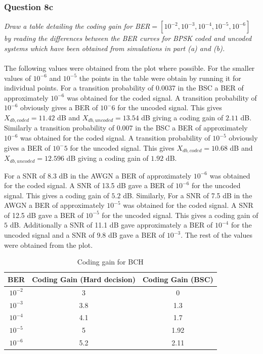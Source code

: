 \documentclass[a4paper]{article}
\begin{document}
\subsubsection{Question 8c} \textit{Draw a table detailing the coding gain for BER$= [10^{-2}, 10^{-3}, 10^{-4} , 10^{-5} , 10^{-6} ]$ by reading the differences between the BER curves for BPSK coded and uncoded systems which have been obtained from simulations in part (a) and (b).} \\
\\
The following values were obtained from the plot where possible. For the smaller values of $10^{-6}$ and $10^{-5}$ the points in the table were obtain by running it for individual points. For a transition probability of 0.0037 in the BSC a BER of approximately $10^{-6}$ was obtained for the coded signal. A transition probability of $10^{-6}$ obviously gives a BER of $10^-6$ for the uncoded signal. This gives $X_{db,coded} = 11.42 $ dB and $X_{db,uncoded} = 13.54 $ dB giving a coding gain of $2.11$ dB. Similarly a transition probability of 0.007 in the BSC a BER of approximately $10^{-6}$ was obtained for the coded signal. A transition probability of $10^{-5}$ obviously gives a BER of $10^-5$ for the uncoded signal. This gives $X_{db,coded} =  10.68$ dB and $X_{db,uncoded} = 12.596 $ dB giving a coding gain of $1.92$ dB. 

For a SNR of 8.3 dB in the AWGN a BER of approximately $10^{-6}$ was obtained for the coded signal. A SNR of 13.5 dB gave a BER of $10^{-6}$ for the uncoded signal. This gives a coding gain of $5.2$ dB. Similarly, For a SNR of 7.5 dB in the AWGN a BER of approximately $10^{-5}$ was obtained for the coded signal. A SNR of 12.5 dB gave a BER of $10^{-5}$ for the uncoded signal. This gives a coding gain of $5$ dB. Additionally a SNR of 11.1 dB gave approximately a BER of $10^{-4}$ for the uncoded signal and a SNR of 9.8 dB gave a BER of $10^{-3}$. The rest of the values were obtained from the plot.

\begin{table}[H]
\centering
\begin{tabular}{| c | c | c |}
\hline
BER & Coding Gain (Hard decision) & Coding Gain (BSC) \\
\hline
$10^{-2}$ & 3 & 0 \\
\hline
$10^{-3}$ & 3.8 & 1.3 \\
\hline
$10^{-4}$ & 4.1 & 1.7  \\
\hline
$10^{-5}$ & 5 & 1.92 \\
\hline
$10^{-6}$ & 5.2 & 2.11 \\
\hline
\end{tabular}
\caption{Coding gain for BCH}
\end{table}
\end{document}
